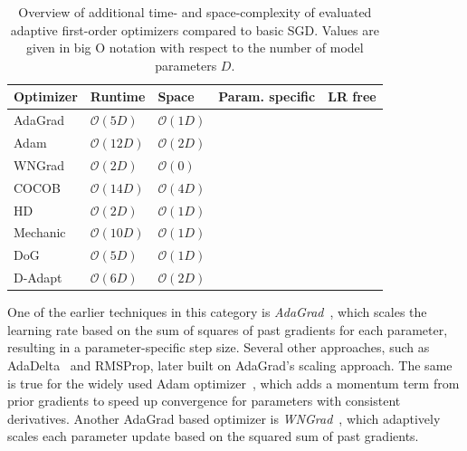 \documentclass{article} %
\newcommand{\cmark}{\ding{51}} %
\newcommand{\xmark}{\ding{55}} %
\begin{document}
\begin{table}[ht]
   \centering
   \scriptsize
   \caption{
      Overview of additional time- and space-complexity of evaluated adaptive first-order optimizers compared to basic SGD.
      Values are given in big O notation with respect to the number of model parameters $D$.
   }\label{tab:param_free_optims}
   \begin{tabular}{@{}lllcc@{}}
      \toprule
      Optimizer                & Runtime            & Space             & Param. specific & LR free \\ \midrule
      AdaGrad                  & $\mathcal{O}(5D)$  & $\mathcal{O}(1D)$ & \cmark          & \xmark  \\
      Adam                     & $\mathcal{O}(12D)$ & $\mathcal{O}(2D)$ & \cmark          & \xmark  \\
      WNGrad                   & $\mathcal{O}(2D)$  & $\mathcal{O}(0)$  & \xmark          & \xmark  \\
      COCOB                    & $\mathcal{O}(14D)$ & $\mathcal{O}(4D)$ & \cmark          & \cmark  \\
      HD\footnotemark[1]       & $\mathcal{O}(2D)$  & $\mathcal{O}(1D)$ & \xmark          & \xmark  \\
      Mechanic\footnotemark[1] & $\mathcal{O}(10D)$ & $\mathcal{O}(1D)$ & \cmark          & \cmark  \\
      DoG                      & $\mathcal{O}(5D)$  & $\mathcal{O}(1D)$ & \xmark          & \cmark  \\
      D-Adapt\footnotemark[1]  & $\mathcal{O}(6D)$  & $\mathcal{O}(2D)$ & \xmark          & \cmark  \\
      \bottomrule
   \end{tabular}
\end{table}

One of the earlier techniques in this category is \textit{AdaGrad}~\citep{duchiAdaptiveSubgradientMethods2011}, which scales the learning rate based on the sum of squares of past gradients for each parameter, resulting in a parameter-specific step size.
Several other approaches, such as AdaDelta~\citep{zeilerADADELTAAdaptiveLearning2012a} and RMSProp, later built on AdaGrad's scaling approach.
The same is true for the widely used Adam optimizer~\citep{kingmaAdamMethodStochastic2017b}, which adds a momentum term from prior gradients to speed up convergence for parameters with consistent derivatives.
Another AdaGrad based optimizer is \textit{WNGrad}~\citep{wuWNGradLearnLearning2020}, which adaptively scales each parameter update based on the squared sum of past gradients.
\end{document}
